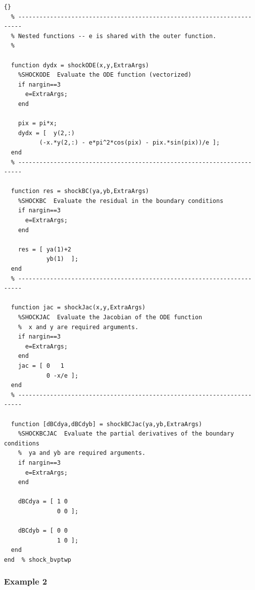 \documentclass{article}
\begin{document}
\begin{lstlisting}[fontadjust]{}
  % -----------------------------------------------------------------------
  % Nested functions -- e is shared with the outer function.
  %

  function dydx = shockODE(x,y,ExtraArgs)
    %SHOCKODE  Evaluate the ODE function (vectorized)
    if nargin==3
      e=ExtraArgs;
    end

    pix = pi*x;
    dydx = [  y(2,:)
	      (-x.*y(2,:) - e*pi^2*cos(pix) - pix.*sin(pix))/e ];
  end
  % -----------------------------------------------------------------------

  function res = shockBC(ya,yb,ExtraArgs)
    %SHOCKBC  Evaluate the residual in the boundary conditions
    if nargin==3
      e=ExtraArgs;
    end

    res = [ ya(1)+2
            yb(1)  ];
  end
  % -----------------------------------------------------------------------

  function jac = shockJac(x,y,ExtraArgs)
    %SHOCKJAC  Evaluate the Jacobian of the ODE function
    %  x and y are required arguments.
    if nargin==3
      e=ExtraArgs;
    end
    jac = [ 0   1
            0 -x/e ];
  end
  % -----------------------------------------------------------------------

  function [dBCdya,dBCdyb] = shockBCJac(ya,yb,ExtraArgs)
    %SHOCKBCJAC  Evaluate the partial derivatives of the boundary conditions
    %  ya and yb are required arguments.
    if nargin==3
      e=ExtraArgs;
    end

    dBCdya = [ 1 0
               0 0 ];

    dBCdyb = [ 0 0
               1 0 ];
  end
end  % shock_bvptwp

\end{lstlisting}



\pagebreak

\subsubsection{Example 2}
\end{document}
